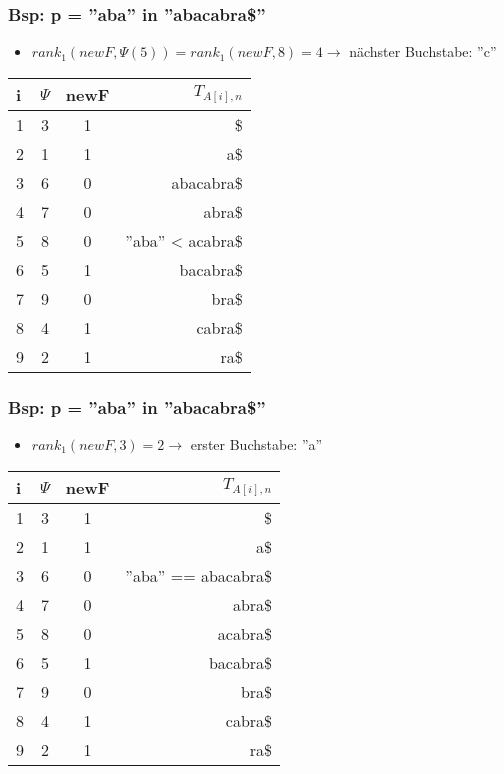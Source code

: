 \documentclass{beamer}
\begin{document}
\begin{frame}
\frametitle{Bsp: p = ''aba'' in ''abacabra\$''}
\begin{itemize}
\item $rank_1(newF, \Psi(5)) = rank_1(newF, 8) = 4 \rightarrow$ nächster Buchstabe: ''c''
\end{itemize}
\begin{tabular}{l<{\ttfamily}|c<{\ttfamily}c<{\ttfamily} r<{\ttfamily}}
i & $\Psi$ & newF & $T_{A[i],n}$ \\\hline
1 & 3 & 1 &\$\\
2 & 1 & 1 &a\$\\
3 & 6 & 0 &abacabra\$\\
4 & 7 & 0 &abra\$\\
5 & 8 & 0 & ''\color{red}ab\color{gray}a\color{black}'' < \color{red}ac\color{gray}abra\$\\
6 & 5 & 1 &bacabra\$\\
7 & 9 & 0 &bra\$\\
8 & 4 & 1 &cabra\$\\
9 & 2 & 1 &ra\$\\
\end{tabular}
\end{frame}

\begin{frame}
\frametitle{Bsp: p = ''aba'' in ''abacabra\$''}
\begin{itemize}
\item $rank_1(newF, 3) = 2 \rightarrow$ erster Buchstabe: ''a''
\end{itemize}
\begin{tabular}{l<{\ttfamily}|c<{\ttfamily}c<{\ttfamily} r<{\ttfamily}}
i & $\Psi$ & newF & $T_{A[i],n}$ \\\hline
1 & 3 & 1 &\$\\
2 & 1 & 1 &a\$\\
3 & 6 & 0 &''\color{red}a\color{gray}ba\color{black}'' == \color{red}a\color{gray}bacabra\$\\
4 & 7 & 0 &abra\$\\
5 & 8 & 0 & acabra\$\\
\color{gray}6 & \color{gray}5 & \color{gray}1 &\color{gray}bacabra\$\\
\color{gray}7 & \color{gray}9 & \color{gray}0 &\color{gray}bra\$\\
\color{gray}8 &\color{gray} 4 & \color{gray}1 &\color{gray}cabra\$\\
\color{gray}9 & \color{gray}2 & \color{gray}1 &\color{gray}ra\$\\
\end{tabular}
\end{frame}
\end{document}
